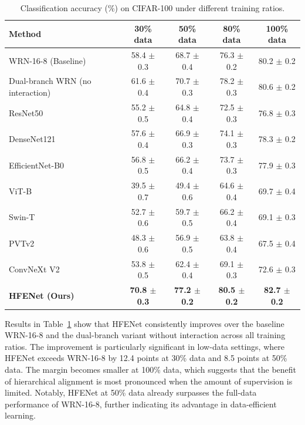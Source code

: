 \documentclass[pdflatex,iicol,sn-mathphys-num]{sn-jnl}
\theoremstyle{thmstyleone}%
\theoremstyle{thmstyletwo}%
\theoremstyle{thmstylethree}%
\begin{document}
\begin{table}[h]
    \centering
    \caption{Classification accuracy (\%) on CIFAR-100 under different training ratios.}
    \label{tab:cifar100_data_ratio}
    \setlength{\tabcolsep}{4pt}
    \renewcommand{\arraystretch}{1.0}
    \small
    \begin{tabular}{@{}lcccc@{}}
    \toprule
    \textbf{Method} & \textbf{30\% data} & \textbf{50\% data} & \textbf{80\% data} & \textbf{100\% data} \\
    \midrule
    WRN-16-8 (Baseline) & 58.4 $\pm$ 0.3 & 68.7 $\pm$ 0.4 & 76.3 $\pm$ 0.2 & 80.2 $\pm$ 0.2 \\
    Dual-branch WRN (no interaction) & 61.6 $\pm$ 0.4 & 70.7 $\pm$ 0.3 & 78.2 $\pm$ 0.3 & 80.6 $\pm$ 0.2 \\
    ResNet50 & 55.2 $\pm$ 0.5 & 64.8 $\pm$ 0.4 & 72.5 $\pm$ 0.3 & 76.8 $\pm$ 0.3 \\
    DenseNet121 & 57.6 $\pm$ 0.4 & 66.9 $\pm$ 0.3 & 74.1 $\pm$ 0.3 & 78.3 $\pm$ 0.2 \\
    EfficientNet-B0 & 56.8 $\pm$ 0.5 & 66.2 $\pm$ 0.4 & 73.7 $\pm$ 0.3 & 77.9 $\pm$ 0.3 \\
    ViT-B & 39.5 $\pm$ 0.7 & 49.4 $\pm$ 0.6 & 64.6 $\pm$ 0.4 & 69.7 $\pm$ 0.4 \\
    Swin-T & 52.7 $\pm$ 0.6 & 59.7 $\pm$ 0.5 & 66.2 $\pm$ 0.4 & 69.1 $\pm$ 0.3 \\
    PVTv2 & 48.3 $\pm$ 0.6 & 56.9 $\pm$ 0.5 & 63.8 $\pm$ 0.4 & 67.5 $\pm$ 0.4 \\
    ConvNeXt V2 & 53.8 $\pm$ 0.5 & 62.4 $\pm$ 0.4 & 69.1 $\pm$ 0.3 & 72.6 $\pm$ 0.3 \\
    \midrule
    \textbf{HFENet (Ours)} & \textbf{70.8 $\pm$ 0.3} & \textbf{77.2 $\pm$ 0.2} & \textbf{80.5 $\pm$ 0.2} & \textbf{82.7 $\pm$ 0.2} \\
    \bottomrule
    \end{tabular}
\end{table}

Results in Table~\ref{tab:cifar100_data_ratio} show that HFENet consistently improves over the baseline WRN-16-8 and the dual-branch variant without interaction across all training ratios. 
The improvement is particularly significant in low-data settings, where HFENet exceeds WRN-16-8 by 12.4 points at 30\% data and 8.5 points at 50\% data. 
The margin becomes smaller at 100\% data, which suggests that the benefit of hierarchical alignment is most pronounced when the amount of supervision is limited. 
Notably, HFENet at 50\% data already surpasses the full-data performance of WRN-16-8, further indicating its advantage in data-efficient learning.
\end{document}
